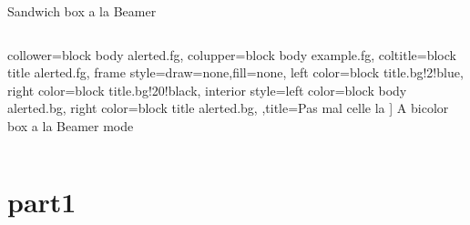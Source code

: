 \documentclass[11pt, xcolor=svgnames]{beamer}
\begin{document}
\begin{darkframes}
\begin{frame}{Sandwich box a la Beamer}
\begin{columns}[c]
\begin{column}{.4\linewidth}
\begin{tcolorbox}
collower=block body alerted.fg, %
colupper=block body example.fg, %
coltitle=block title alerted.fg, %
frame style={draw=none,fill=none, left color=block title.bg!2!blue, right color=block title.bg!20!black},
interior style={left color=block body alerted.bg, right color=block title alerted.bg}, %
,title=Pas mal celle la ]
A bicolor box
\tcblower %
a la Beamer mode
\end{tcolorbox}
\end{column}
\end{columns}
\end{frame}

\section{part1}

\end{darkframes}
\end{document}
